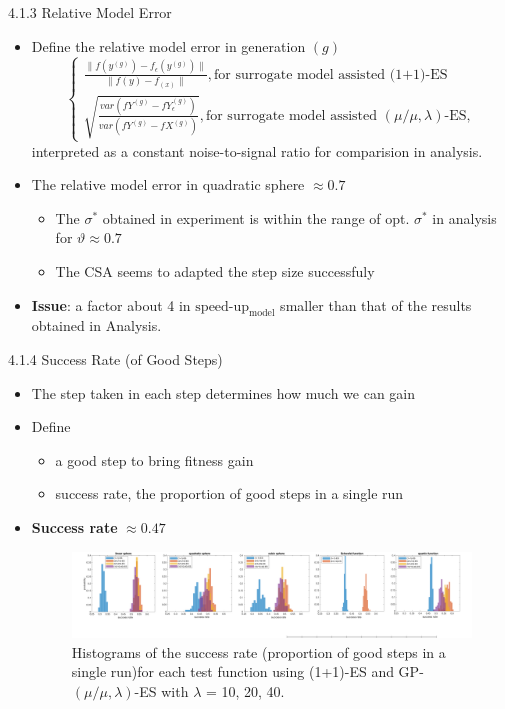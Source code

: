 \documentclass{beamer}
\begin{document}
\begin{frame}{4.1.3 Relative Model Error  }
\begin{itemize}
    \item Define the relative model error in generation $(g)$
    $$\begin{cases}\frac{\|f(y^{(g)})-f_{\epsilon}(y^{(g)}) \|}{\|f(y)-f_(x) \|},\text{for surrogate model assisted (1+1)-ES} \\ \sqrt{\frac{ var(fY^{(g)}-fY_{\epsilon}^{(g)})}{var(fY^{(g)}-fX^{(g)})}},\text{for surrogate model assisted }(\mu/\mu,\lambda)\text{-ES},\end{cases}$$
    interpreted as a constant noise-to-signal ratio for comparision in analysis.
    \item The relative model error in quadratic sphere $\approx 0.7$
        \begin{itemize}
            \item The $\sigma^*$ obtained in experiment is within the range of opt. $\sigma^*$ in analysis for $\vartheta \approx 0.7$
            \item The CSA seems to adapted the step size successfuly
        \end{itemize}
    \item \textbf{Issue}: a factor about 4 in $\text{speed-up}_{\text{model}}$ smaller than that of the results obtained in Analysis.
    
\end{itemize}
\end{frame}

\begin{frame}{4.1.4 Success Rate (of Good Steps)}
\begin{itemize}
    \item The step taken in each step determines how much we can gain  
    \item Define 
        \begin{itemize}
            \item a good step to bring fitness gain
            \item success rate, the proportion of good steps in a single run 
        \end{itemize}
    \item \textbf{Success rate} $\approx 0.47$
\begin{figure}
\includegraphics[width=1.0\linewidth]{success_NO_emergency_v3_final.pdf}
    \caption{Histograms of the success rate (proportion of good steps in a single run)for each test function using (1+1)-ES and GP-$(\mu/\mu,\lambda)$-ES with $\lambda$ = 10, 20, 40.}
\end{figure}
\end{itemize}
\end{frame}
\end{document}
